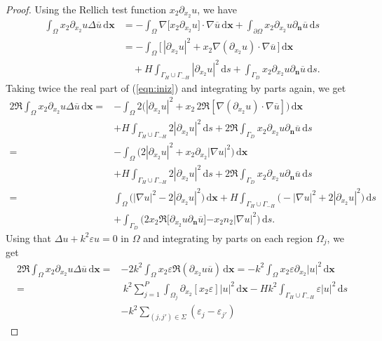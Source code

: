 \documentclass[a4paper,10pt]{article}
\newcommand{\bx}{{\mathbf x}}
\newcommand{\bn}{{\mathbf n}}
\newcommand{\rd}{{\,\mathrm d}}
\newcommand{\dn}{{\partial_\bn}}
\newcommand{\dxt}{{\partial_{x_2}}}
\newcommand{\cu}{{\overline{u}}}
\newcommand{\GD}{{\Gamma_D}}
\newcommand{\GH}{{\Gamma_H}}
\newcommand{\GmH}{{\Gamma_{-H}}}
\begin{document}
\begin{proof}
Using the Rellich test function $x_2 \dxt u$, we have
\begin{align} \label{eqn:iniz}
	\int_\Omega x_2\dxt u \Delta \cu\rd\bx
	&=  - \int_{\Omega}\nabla \Big[x_2 \dxt u\Big] \cdot \nabla \cu\rd\bx
	+ \int_{\partial \Omega} x_2 \dxt u \dn \cu\rd s \\ \nonumber
	&=  - \int_\Omega \biggl[ \, \left| \dxt u \right|^2
	+ x_2 \nabla \left( \dxt u \right) \cdot \nabla \cu \, \biggl]\rd \bx \\
	&\quad\nonumber
	+ H \int_{{\GH\cup\GmH}} \left| \dxt u \right|^2 \rd s
	+ \int_{\GD} x_2 \dxt u \dn \cu\rd s.
\end{align}
Taking twice the real part of (\ref{eqn:iniz}) {and integrating by parts again}, we get
\begin{align} \label{eqn:realpart}
	2 \Re \int_\Omega x_2 \dxt u \Delta \cu \rd\bx
	= &  - \int_\Omega 2 \bigg(\left| \dxt u \right|^2 + x_2 \, 2 \Re \left[ \nabla \left( \dxt u \right) \cdot \nabla \cu \right]\bigg) \rd\bx\\ \nonumber
	& +  H \int_{{\GH\cup\GmH}} 2 \left| \dxt u \right|^2 \rd s
	+2\Re\int_{\GD} x_2 \dxt u \dn \cu\rd s\\ \nonumber
	= & - \int_\Omega \bigg(2\left| \dxt u \right|^2 +x_2 \dxt |\nabla u|^2\bigg)\rd\bx\\ \nonumber
	& +  H \int_{{\GH\cup\GmH}} 2 \left| \dxt u \right|^2\rd s
	+ 2\Re\int_{\GD} x_2 \dxt u \dn \cu\rd s \\ \nonumber
	= & \int_\Omega \bigg(|\nabla u|^2 - 2 \left| \dxt u \right|^2\bigg){\rd\bx}
	+ H \int_{{\GH\cup\GmH}} \biggl( - |\nabla u|^2 + 2 \left| \dxt u \right|^2 \biggl){\rd s}\\ \nonumber
	& %
	+ \int_{\GD} \biggl(2 x_2 \Re\bigg[\dxt u \dn \cu\bigg]
	{-x_2n_2|\nabla u|^2}\biggl){\rd s}.
\end{align}
Using that $\Delta u + k^2 \varepsilon u = 0$ in $\Omega$ {and integrating by parts on each region $\Omega_j$}, we get
\begin{align} \label{eqn:subs}
	2 \Re \int_\Omega x_2\dxt u \Delta \cu\rd\bx
	= & -2k^2 \int_\Omega x_2 \varepsilon  \Re \left( \dxt u {\cu} \right)\rd\bx
	= -k^2 \int_\Omega x_2 \varepsilon \dxt|u|^2\rd\bx \\ \nonumber
	= &\ k^2{\sum_{j=1}^P \int_{\Omega_j}} \dxt[x_2 \varepsilon]  |u|^2\rd\bx
	- Hk^2 \int_{{\GH\cup\GmH}} \varepsilon |u|^2\rd s
	\\ \nonumber
	& -  k^2{\sum_{(j,j')\in\Sigma} ( \varepsilon_{j} -\varepsilon_{j'} )
}
\end{align}
\end{proof}
\end{document}
